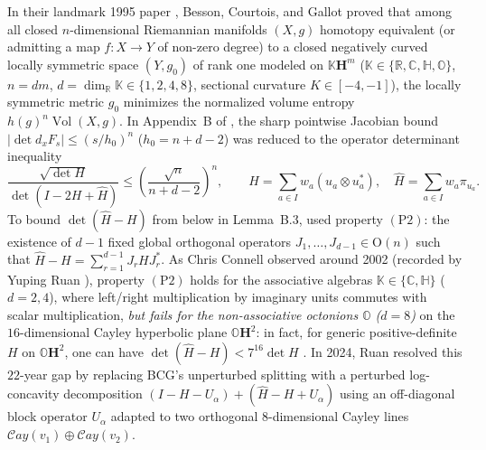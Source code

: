\documentclass[10pt]{article}
\renewcommand{\_}{\origus\allowbreak}
\newcommand{\C}{\mathbb{C}}
\newcommand{\R}{\mathbb{R}}
\newcommand{\Quat}{\mathbb{H}}
\newcommand{\Oct}{\mathbb{O}}
\newcommand{\Kfield}{\mathbb{K}}
\newcommand{\Hyp}{\mathbf{H}}
\newcommand{\Vol}{\operatorname{Vol}}
\begin{document}
In their landmark 1995 paper \cite{BCG95}, Besson, Courtois, and Gallot proved that among all closed
$n$-dimensional Riemannian manifolds $(X, g)$ homotopy equivalent (or admitting a map $f : X \to Y$ of
non-zero degree) to a closed negatively curved locally symmetric space $(Y, g_0)$ of rank one modeled on
$\Kfield\Hyp^m$ ($\Kfield \in \{\R, \C, \Quat, \Oct\}$, $n = d m$, $d = \dim_\R \Kfield \in \{1,2,4,8\}$,
sectional curvature $K \in [-4,-1]$), the locally symmetric metric $g_0$ minimizes the normalized volume
entropy $h(g)^n \Vol(X, g)$. In Appendix~B of \cite{BCG95}, the sharp pointwise Jacobian bound
$|\det d_x F_s| \le (s / h_0)^n$ ($h_0 = n + d - 2$) was reduced to the operator determinant inequality
\begin{equation}\label{eq:bcg_det}
\frac{\sqrt{\det H}}{\det(I - 2H + \widehat{H})} \le \left(\frac{\sqrt{n}}{n + d - 2}\right)^n,
\qquad H = \sum_{a \in I} w_a (u_a \otimes u_a^*), \quad \widehat{H} = \sum_{a \in I} w_a \pi_{u_a}.
\end{equation}
To bound $\det(\widehat{H} - H)$ from below in Lemma~B.3, \cite{BCG95} used property $\mathrm{(P2)}$:
the existence of $d - 1$ fixed global orthogonal operators $J_1, \dots, J_{d-1} \in \mathrm{O}(n)$ such
that $\widehat{H} - H = \sum_{r=1}^{d-1} J_r H J_r^*$. As Chris Connell observed around 2002 (recorded by
Yuping Ruan \cite{Rua24}), property $\mathrm{(P2)}$ holds for the associative algebras $\Kfield \in \{\C, \Quat\}$
($d = 2, 4$), where left/right multiplication by imaginary units commutes with scalar multiplication,
\emph{but fails for the non-associative octonions $\Oct$ ($d = 8$)} on the $16$-dimensional Cayley
hyperbolic plane $\Oct\Hyp^2$: in fact, for generic positive-definite $H$ on $\Oct\Hyp^2$, one can have
$\det(\widehat{H} - H) < 7^{16} \det H$ \cite[Remark~3.3]{Rua24}. In 2024, Ruan \cite{Rua24} resolved
this $22$-year gap by replacing BCG's unperturbed splitting with a perturbed log-concavity decomposition
$(I - H - U_\alpha) + (\widehat{H} - H + U_\alpha)$ using an off-diagonal block operator $U_\alpha$
adapted to two orthogonal $8$-dimensional Cayley lines $\mathcal{C}ay(v_1) \oplus \mathcal{C}ay(v_2)$.
\end{document}
